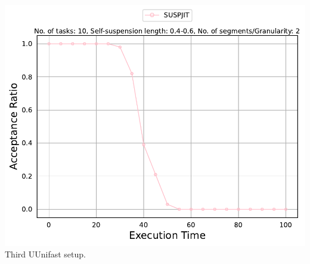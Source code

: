 \documentclass[]{article}
\begin{document}
\begin{minipage}[t]{0.48\linewidth}
		\includegraphics[width=\linewidth]{SUSPJIT[2][0.4-0.6][10].pdf}
		Third UUnifast setup.
		\vspace{0.3cm}
		
		
	\end{minipage}\hfill
\end{document}
